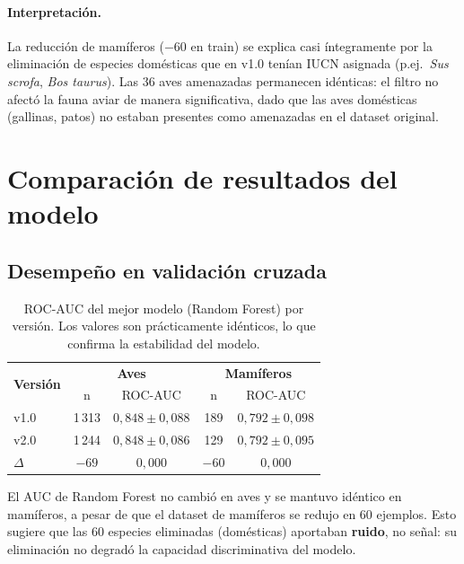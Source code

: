\documentclass[12pt,a4paper]{article}
\newcommand{\celplus}[1]{\cellcolor{verdeClaro}#1}   %
\begin{document}
\paragraph{Interpretación.}
La reducción de mamíferos ($-$60 en train) se explica casi íntegramente por la eliminación
de especies domésticas que en v1.0 tenían IUCN asignada (p.ej.\ \textit{Sus scrofa},
\textit{Bos taurus}).  Las 36 aves amenazadas permanecen idénticas: el filtro no afectó
la fauna aviar de manera significativa, dado que las aves domésticas (gallinas, patos) no
estaban presentes como amenazadas en el dataset original.

\section{Comparación de resultados del modelo}

\subsection{Desempeño en validación cruzada}

\begin{table}[H]
  \centering
  \caption{ROC-AUC del mejor modelo (Random Forest) por versión.
           Los valores son prácticamente idénticos, lo que confirma la estabilidad del modelo.}
  \label{tab:auc_comp}
  \begin{tabular}{lcccc}
    \toprule
    \multirow{2}{*}{\textbf{Versión}} & \multicolumn{2}{c}{\textbf{Aves}} & \multicolumn{2}{c}{\textbf{Mamíferos}} \\
    & n & ROC-AUC & n & ROC-AUC \\
    \midrule
    v1.0 & 1\,313 & $0{,}848 \pm 0{,}088$ & 189 & $0{,}792 \pm 0{,}098$ \\
    v2.0 & 1\,244 & $0{,}848 \pm 0{,}086$ & 129 & $0{,}792 \pm 0{,}095$ \\
    \midrule
    $\Delta$ & $-69$ & \celplus{$0{,}000$} & $-60$ & \celplus{$0{,}000$} \\
    \bottomrule
  \end{tabular}
\end{table}

El AUC de Random Forest no cambió en aves y se mantuvo idéntico en mamíferos, a pesar de
que el dataset de mamíferos se redujo en 60 ejemplos.
Esto sugiere que las 60 especies eliminadas (domésticas) aportaban \textbf{ruido}, no señal:
su eliminación no degradó la capacidad discriminativa del modelo.
\end{document}
